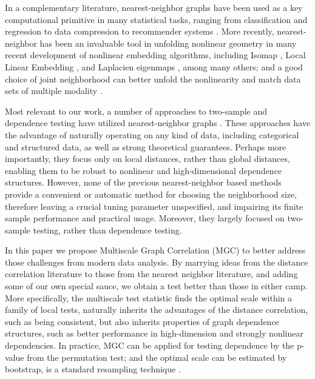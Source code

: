 \documentclass[11pt]{article}
\begin{document}
In a complementary literature, nearest-neighbor graphs have been used as a key computational primitive in many statistical tasks, ranging from classification and regression \cite{Stone1977} to data compression to recommender systems \cite{Sarwar2000}. 
More recently, nearest-neighbor has been an invaluable tool in unfolding nonlinear geometry in many recent development of nonlinear embedding algorithms, including Isomap \cite{TenenbaumSilvaLangford2000, SilvaTenenbaum2003}, Local Linear Embedding \cite{SaulRoweis2000, RoweisSaul2003}, and Laplacien eigenmaps \cite{BelkinNiyogi2003}, among many others; and a good choice of joint neighborhood can better unfold the nonlinearity and match data sets of multiple modality \cite{ShenVogelsteinPriebe2015}.

Most relevant to our work, a number of approaches to two-sample and dependence testing have utilized nearest-neighbor graphs \cite{David1966,Friedman1983,Schilling1986,Dumcke2014}.  These approaches have the advantage of naturally operating on any kind of data, including categorical and structured data, as well as strong theoretical guarantees.  Perhaps more importantly, they focus only on local distances, rather than global distances, enabling them to be robust to nonlinear and high-dimensional dependence structures.  However, none of the previous nearest-neighbor based methods provide a convenient or automatic method for choosing the neighborhood size, therefore leaving a crucial tuning parameter unspecified, and impairing its finite sample performance and practical usage. Moreover, they largely focused on two-sample testing, rather than dependence testing.  

In this paper we propose Multiscale Graph Correlation (MGC) to better address those challenges from modern data analysis. By marrying ideas from the distance correlation literature to those from the nearest neighbor literature, and adding some of our own special sauce, we obtain a test better than those in either camp.  More specifically,  the multiscale test statistic finds the optimal scale within a family of local tests, naturally inherits the advantages of the distance correlation, such as being consistent, but also inherits properties of graph dependence structures, such as better performance in high-dimension and strongly nonlinear dependencies. In practice, MGC can be applied for testing dependence by the p-value from the permutation test; and the optimal scale can be estimated by bootstrap,  is a standard resampling technique \cite{EfronTibshiraniBook}.
\end{document}
